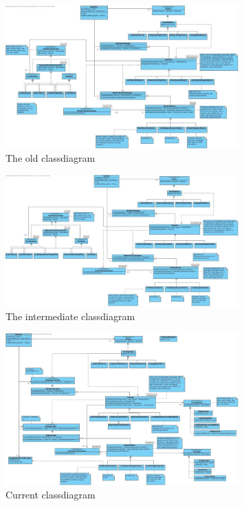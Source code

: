 \documentclass[i2]{oss}
\begin{document}
\begin{figure}[tbp]
\begin{center}
    \includegraphics[width=0.8\textwidth]{klassendiagramOud}
    \caption{The old classdiagram}
	\label{fig:kd-oud}
\end{center}
\end{figure}



\begin{figure}[tbp]
\begin{center}
    \includegraphics[width=0.8\textwidth]{klassendiagram}
    \caption{The intermediate classdiagram}
	\label{fig:kd-tt}
\end{center}
\end{figure}




\begin{figure}[tbp]
\begin{center}
    \includegraphics[width=0.8\textwidth]{klassendiagram3}
    \caption{Current classdiagram}
	\label{fig:kd-h}
\end{center}
\end{figure}
\end{document}
